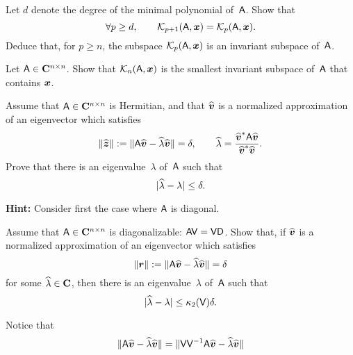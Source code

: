 \begin{exercise}
    Let $d$ denote the degree of the minimal polynomial of~$\mathsf A$.
    Show that
    \[
        \forall p \geq d, \qquad
        \mathcal K_{p+1}(\mathsf A, \mathbf{\boldsymbol{x}}) =
        \mathcal K_{p}(\mathsf A, \mathbf{\boldsymbol{x}}).
    \]
    Deduce that, for $p \geq n$,
    the subspace $\mathcal K_{p}(\mathsf A, \mathbf{\boldsymbol{x}})$ is an invariant subspace of~$\mathsf A$.
\end{exercise}

\begin{exercise}
    Let $\mathsf A \in \mathbf C^{n \times n}$.
    Show that $\mathcal K_{n}(\mathsf A, \mathbf{\boldsymbol{x}})$ is the smallest invariant subspace of~$\mathsf A$ that contains $\mathbf{\boldsymbol{x}}$.
\end{exercise}

\begin{exercise}
    \label{exercise:a_posteriori_1}
    Assume that $\mathsf A \in \mathbf C^{n \times n}$ is Hermitian,
    and that $\widehat {\mathbf{\boldsymbol{v}}}$ is a normalized approximation of an eigenvector which satisfies
    \[
        \lVert\widehat {\mathbf{\boldsymbol{z}}}\rVert :=  \lVert\mathsf A \widehat {\mathbf{\boldsymbol{v}}} - \widehat \lambda \widehat {\mathbf{\boldsymbol{v}}}\rVert = \delta,
        \qquad \widehat \lambda = \frac{\widehat {\mathbf{\boldsymbol{v}}}^* \mathsf A \widehat {\mathbf{\boldsymbol{v}}}}{\widehat {\mathbf{\boldsymbol{v}}}^* \widehat {\mathbf{\boldsymbol{v}}}}.
    \]
    Prove that there is an eigenvalue~$\lambda$ of~$\mathsf A$ such that
    \[
        \lvert\widehat \lambda - \lambda\rvert \leq \delta.
    \]

    \noindent \textbf{Hint:} Consider first the case where $\mathsf A$ is diagonal.
\end{exercise}

\begin{exercise}
    \label{exercise:a_posteriori_2}
    Assume that $\mathsf A \in \mathbf C^{n \times n}$ is diagonalizable: $\mathsf A \mathsf V = \mathsf V \mathsf D$.
    Show that, if $\widehat {\mathbf{\boldsymbol{v}}}$ is a normalized approximation of an eigenvector which satisfies
    \[
        \lVert\mathbf{\boldsymbol{r}}\rVert :=  \lVert\mathsf A \widehat {\mathbf{\boldsymbol{v}}} - \widehat \lambda \widehat {\mathbf{\boldsymbol{v}}}\rVert = \delta
    \]
    for some $\widehat \lambda \in \mathbf C$,
    then there is an eigenvalue~$\lambda$ of~$\mathsf A$ such that
    \[
        \lvert\widehat \lambda - \lambda\rvert \leq \kappa_2(\mathsf V) \delta.
    \]

    Notice that
    \[
        \lVert\mathsf A \widehat {\mathbf{\boldsymbol{v}}} - \widehat \lambda \widehat {\mathbf{\boldsymbol{v}}}\rVert
        = \lVert\mathsf V \mathsf V^{-1} \mathsf A \widehat {\mathbf{\boldsymbol{v}}} - \widehat \lambda \widehat {\mathbf{\boldsymbol{v}}}\rVert
    \]
\end{exercise}

